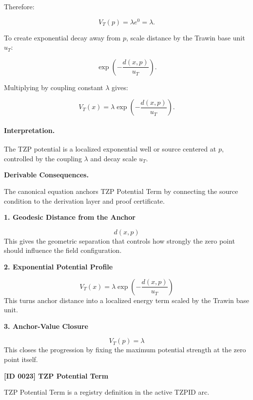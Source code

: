Therefore:

\begin{equation}
V_T(p)=\lambda e^0=\lambda .
\end{equation}

To create exponential decay away from $p$, scale distance by the Trawin base unit $u_T$:

\begin{equation}
\exp\left(-\frac{d(x,p)}{u_T}\right).
\end{equation}

Multiplying by coupling constant $\lambda$ gives:

\begin{equation}
\boxed{
V_T(x)
=
\lambda
\exp\left(
-\frac{d(x,p)}{u_T}
\right).
}
\end{equation}

\paragraph{Interpretation.}
The TZP potential is a localized exponential well or source centered at $p$, controlled by the coupling $\lambda$ and decay scale $u_T$.

\par\vspace{0.35em}
\noindent\textbf{Derivable Consequences.}\quad
\begingroup
\footnotesize
\raggedright
The canonical equation anchors TZP Potential Term by connecting the source condition to the derivation layer and proof certificate.
\par\endgroup

\noindent\textbf{1. Geodesic Distance from the Anchor}\par
\[
d(x,p)
\]
\noindent This gives the geometric separation that controls how strongly the zero point should influence the field configuration.\par
\noindent\textbf{2. Exponential Potential Profile}\par
\[
V_{T}(x)
=
\lambda
\exp\!\left(
-\frac{d(x,p)}{u_{T}}
\right)
\]
\noindent This turns anchor distance into a localized energy term scaled by the Trawin base unit.\par
\noindent\textbf{3. Anchor-Value Closure}\par
\[
V_{T}(p)=\lambda
\]
\noindent This closes the progression by fixing the maximum potential strength at the zero point itself.\par

\clearpage
\noindent\textbf{[ID 0023] TZP Potential Term}\par
\vspace{0.35em}
\begingroup\small
{}
TZP Potential Term is a registry definition in the active TZPID arc.

